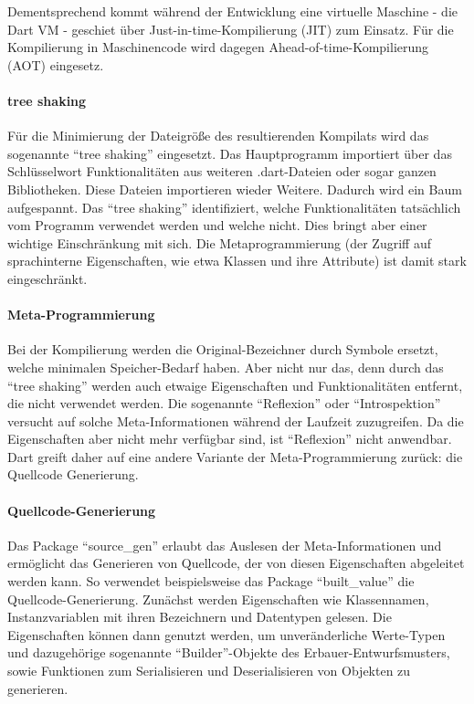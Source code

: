 Dementsprechend kommt während der Entwicklung eine virtuelle Maschine - die Dart VM - geschiet über Just-in-time-Kompilierung (JIT) zum Einsatz. Für die Kompilierung in Maschinencode wird dagegen Ahead-of-time-Kompilierung (AOT) eingesetz.

\paragraph{tree shaking}
Für die Minimierung der Dateigröße des resultierenden Kompilats wird das sogenannte \enquote{tree shaking} eingesetzt. Das Hauptprogramm importiert über das Schlüsselwort  Funktionalitäten aus  weiteren .dart-Dateien oder sogar ganzen Bibliotheken. Diese Dateien importieren wieder Weitere. Dadurch wird ein Baum aufgespannt. Das \enquote{tree shaking} identifiziert, welche Funktionalitäten tatsächlich vom Programm verwendet werden und welche nicht. Dies bringt aber einer wichtige Einschränkung mit sich. Die Metaprogrammierung (der Zugriff auf sprachinterne Eigenschaften, wie etwa Klassen und ihre Attribute) ist damit stark eingeschränkt.

\paragraph{Meta-Programmierung}
Bei der Kompilierung werden die Original-Bezeichner durch Symbole ersetzt, welche minimalen Speicher-Bedarf haben. Aber nicht nur das, denn durch das \enquote{tree shaking} werden auch etwaige Eigenschaften und Funktionalitäten entfernt, die nicht verwendet werden. Die sogenannte \enquote{Reflexion} oder \enquote{Introspektion} versucht auf solche Meta-Informationen während der Laufzeit zuzugreifen. Da die Eigenschaften aber nicht mehr verfügbar sind, ist \enquote{Reflexion} nicht anwendbar. Dart greift daher auf eine andere Variante der Meta-Programmierung zurück: die Quellcode Generierung.

\paragraph{Quellcode-Generierung}
Das Package \enquote{source_gen} erlaubt das Auslesen der Meta-Informationen und ermöglicht das Generieren von Quellcode, der von diesen Eigenschaften abgeleitet werden kann. So verwendet beispielsweise das Package \enquote{built_value} die Quellcode-Generierung. Zunächst werden Eigenschaften wie Klassennamen, Instanzvariablen mit ihren Bezeichnern und Datentypen gelesen. Die Eigenschaften können dann genutzt werden, um unveränderliche Werte-Typen und dazugehörige sogenannte \enquote{Builder}-Objekte des Erbauer-Entwurfsmusters, sowie Funktionen zum Serialisieren und Deserialisieren von Objekten zu generieren. 

